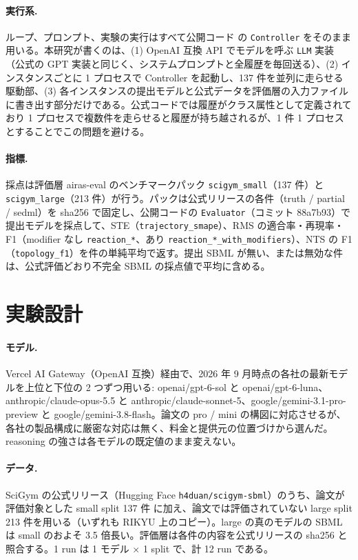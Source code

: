 \documentclass{article}
\begin{document}
\paragraph{実行系.}
ループ、プロンプト、実験の実行はすべて公開コード \citep{h4duan-2025-scigym} の \texttt{Controller} をそのまま用いる。本研究が書くのは、(1) OpenAI 互換 API でモデルを呼ぶ \texttt{LLM} 実装（公式の GPT 実装と同じく、システムプロンプトと全履歴を毎回送る）、(2) インスタンスごとに 1 プロセスで Controller を起動し、137 件を並列に走らせる駆動部、(3) 各インスタンスの提出モデルと公式データを評価層の入力ファイルに書き出す部分だけである。公式コードでは履歴がクラス属性として定義されており 1 プロセスで複数件を走らせると履歴が持ち越されるが、1 件 1 プロセスとすることでこの問題を避ける。

\paragraph{指標.}
採点は評価層 airas-eval のベンチマークパック \texttt{scigym\_small}（137 件）と \texttt{scigym\_large}（213 件）が行う。パックは公式リリースの各件（truth / partial / sedml）を sha256 で固定し、公開コードの \texttt{Evaluator}（コミット 88a7b93）で提出モデルを採点して、STE（\texttt{trajectory\_smape}）、RMS の適合率・再現率・F1（modifier なし \texttt{reaction\_*}、あり \texttt{reaction\_*\_with\_modifiers}）、NTS の F1（\texttt{topology\_f1}）を件の単純平均で返す。提出 SBML が無い、または無効な件は、公式評価どおり不完全 SBML の採点値で平均に含める。

\section{実験設計}
\label{sec:design}
\paragraph{モデル.}
Vercel AI Gateway（OpenAI 互換）経由で、2026 年 9 月時点の各社の最新モデルを上位と下位の 2 つずつ用いる: openai/gpt-6-sol と openai/gpt-6-luna、anthropic/claude-opus-5.5 と anthropic/claude-sonnet-5、google/gemini-3.1-pro-preview と google/gemini-3.8-flash。論文の pro / mini の構図に対応させるが、各社の製品構成に厳密な対応は無く、料金と提供元の位置づけから選んだ。reasoning の強さは各モデルの既定値のまま変えない。

\paragraph{データ.}
SciGym の公式リリース（Hugging Face \texttt{h4duan/scigym-sbml}）のうち、論文が評価対象とした small split 137 件 \cite[s1.p2]{duan-2025-measuring} に加え、論文では評価されていない large split 213 件を用いる（いずれも RIKYU 上のコピー）。large の真のモデルの SBML は small のおよそ 3.5 倍長い。評価層は各件の内容を公式リリースの sha256 と照合する。1 run は 1 モデル × 1 split で、計 12 run である。
\end{document}
